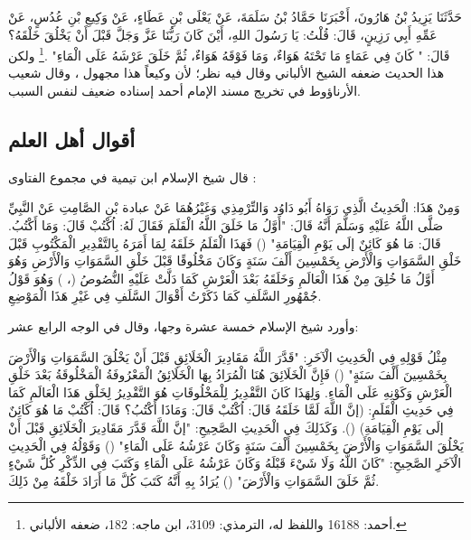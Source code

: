 حَدَّثَنَا يَزِيدُ بْنُ هَارُونَ، أَخْبَرَنَا حَمَّادُ بْنُ سَلَمَةَ، عَنْ يَعْلَى بْنِ عَطَاءٍ، عَنْ وَكِيعِ بْنِ عُدُسٍ، عَنْ عَمِّهِ أَبِي رَزِينٍ، قَالَ: قُلْتُ: يَا رَسُولَ اللهِ، أَيْنَ كَانَ رَبُّنَا عَزَّ وَجَلَّ قَبْلَ أَنْ يَخْلُقَ خَلْقَهُ؟ قَالَ: " كَانَ فِي عَمَاءٍ مَا تَحْتَهُ هَوَاءٌ، وَمَا فَوْقَهُ هَوَاءٌ، ثُمَّ خَلَقَ عَرْشَهُ عَلَى الْمَاءِ" \href{https://shamela.ws/book/25794/12650#p1}{\faExternalLink} \cite{ahmid}.\footnote{أحمد: 16188 واللفظ له، الترمذي: 3109، ابن ماجه: 182، ضعفه الألباني.}  ولكن هذا الحديث ضعفه الشيخ الألباني وقال فيه نظر؛ لأن وكيعاً هذا مجهول \href{https://shamela.ws/book/9442/5278#p10}{\faExternalLink} \cite{albani_Sahiha}، وقال شعيب الأرناؤوط في تخريج مسند الإمام أحمد إسناده ضعيف لنفس السبب.
\subsection{أقوال أهل العلم}

قال شيخ الإسلام ابن تيمية في مجموع الفتاوى \href{https://shamela.ws/book/7289/9349#p1}{\faExternalLink}:

وَمِنْ هَذَا: الْحَدِيثُ الَّذِي رَوَاهُ أَبُو دَاوُد وَالتِّرْمِذِي وَغَيْرُهُمَا عَنْ عبادة بْنِ الصَّامِتِ عَنْ النَّبِيِّ صَلَّى اللَّهُ عَلَيْهِ وَسَلَّمَ أَنَّهُ قَالَ: "{أَوَّلُ مَا خَلَقَ اللَّهُ الْقَلَمَ فَقَالَ لَهُ: اُكْتُبْ قَالَ: وَمَا أَكْتُبُ. قَالَ: مَا هُوَ كَائِنٌ إلَى يَوْمِ الْقِيَامَةِ}" () فَهَذَا الْقَلَمُ خَلَقَهُ لِمَا أَمَرَهُ بِالتَّقْدِيرِ الْمَكْتُوبِ قَبْلَ خَلْقِ السَّمَوَاتِ وَالْأَرْضِ بِخَمْسِينَ أَلْفَ سَنَةٍ وَكَانَ مَخْلُوقًا قَبْلَ خَلْقِ السَّمَوَاتِ وَالْأَرْضِ وَهُوَ أَوَّلُ مَا خُلِقَ مِنْ هَذَا الْعَالَمِ وَخَلَقَهُ بَعْدَ الْعَرْشِ كَمَا دَلَّتْ عَلَيْهِ النُّصُوصُ (، ) وَهُوَ قَوْلُ جُمْهُورِ السَّلَفِ كَمَا ذَكَرْتُ أَقْوَالَ السَّلَفِ فِي غَيْرِ هَذَا الْمَوْضِعِ.

وأورد شيخ الإسلام خمسة عشرة وجها، وقال في الوجه الرابع عشر: 

مِثْلُ قَوْلِهِ فِي الْحَدِيثِ الْآخَرِ: "{قَدَّرَ اللَّهُ مَقَادِيرَ الْخَلَائِقِ قَبْلَ أَنْ يَخْلُقَ السَّمَوَاتِ وَالْأَرْضَ بِخَمْسِينَ أَلْفَ سَنَةٍ}" () فَإِنَّ الْخَلَائِقَ هُنَا الْمُرَادُ بِهَا الْخَلَائِقُ الْمَعْرُوفَةُ الْمَخْلُوقَةُ بَعْدَ خَلْقِ الْعَرْشِ وَكَوْنِهِ عَلَى الْمَاءِ. وَلِهَذَا كَانَ التَّقْدِيرُ لِلْمَخْلُوقَاتِ هُوَ التَّقْدِيرُ لِخَلْقِ هَذَا الْعَالَمِ كَمَا فِي حَدِيثِ الْقَلَمِ: (إنَّ اللَّهَ لَمَّا خَلَقَهُ قَالَ: اُكْتُبْ قَالَ: وَمَاذَا أَكْتُبُ؟ قَالَ: اُكْتُبْ مَا هُوَ كَائِنٌ إلَى يَوْمِ الْقِيَامَةِ) (). وَكَذَلِكَ فِي الْحَدِيثِ الصَّحِيحِ: "{إنَّ اللَّهَ قَدَّرَ مَقَادِيرَ الْخَلَائِقِ قَبْلَ أَنْ يَخْلُقَ السَّمَوَاتِ وَالْأَرْضَ بِخَمْسِينَ أَلْفَ سَنَةٍ وَكَانَ عَرْشُهُ عَلَى الْمَاءِ}" () وَقَوْلُهُ فِي الْحَدِيثِ الْآخَرِ الصَّحِيحِ: "{كَانَ اللَّهُ وَلَا شَيْءَ قَبْلَهُ وَكَانَ عَرْشُهُ عَلَى الْمَاءِ وَكَتَبَ فِي الذِّكْرِ كُلَّ شَيْءٍ ثُمَّ خَلَقَ السَّمَوَاتِ وَالْأَرْضَ}" () يُرَادُ بِهِ أَنَّهُ كَتَبَ كُلَّ مَا أَرَادَ خَلْقَهُ مِنْ ذَلِكَ.

